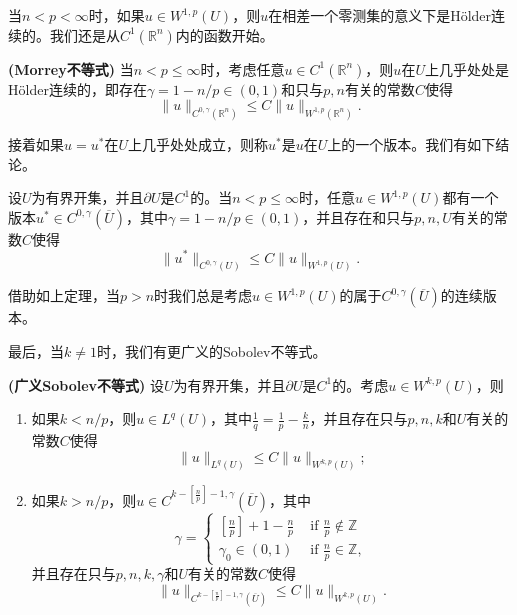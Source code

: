 \documentclass[a4paper,10pt]{ctexart}
\begin{document}
当$ n<p<\infty $时，如果$ u\in W^{1,p}(U) $，则$ u $在相差一个零测集的意义下是Hölder连续的。我们还是从$ C^1(\mathbb{R}^n) $内的函数开始。
\begin{theorem}{\normalfont\textbf{(Morrey不等式)}}
    当$ n<p\leqslant \infty $时，考虑任意$ u\in C^1(\mathbb{R}^n) $，则$ u $在$ U $上几乎处处是Hölder连续的，即存在$ \gamma = 1 - n / p\in (0,1) $和只与$ p,n $有关的常数$ C $使得
    \begin{equation}
        \| u \|_{C^{0,\gamma}(\mathbb{R}^n)} \leqslant C \| u \|_{W^{1,p}(\mathbb{R}^n)}.
    \end{equation}
\end{theorem}
接着如果$ u = u^* $在$ U $上几乎处处成立，则称$ u^* $是$ u $在$ U $上的一个版本。我们有如下结论。
\begin{theorem}
    设$ U $为有界开集，并且$ \partial U $是$ C^1 $的。当$ n<p\leqslant \infty $时，任意$ u\in W^{1,p}(U) $都有一个版本$ u^*\in C^{0,\gamma}(\overline{U}) $，其中$ \gamma = 1 - n / p\in (0,1) $，并且存在和只与$ p,n,U $有关的常数$ C $使得
    \begin{equation}
        \| u^* \|_{C^{0,\gamma}(U)} \leqslant C \| u \|_{W^{1,p}(U)}.
    \end{equation}
\end{theorem}
\noindent 借助如上定理，当$ p>n $时我们总是考虑$ u\in W^{1,p}(U) $的属于$ C^{0,\gamma}(\overline{U}) $的连续版本。

最后，当$ k\ne 1 $时，我们有更广义的Sobolev不等式。
\begin{theorem}{\normalfont\textbf{(广义Sobolev不等式)}}
    设$ U $为有界开集，并且$ \partial U $是$ C^1 $的。考虑$ u\in W^{k,p}(U) $，则
    \begin{enumerate}
        \item 如果$ k< n / p $，则$ u\in L^q(U) $，其中$ \frac{1}{q} = \frac{1}{p} - \frac{k}{n} $，并且存在只与$ p,n,k $和$ U $有关的常数$ C $使得
        \begin{equation}
            \| u \|_{L^q(U)} \leqslant C \| u \|_{W^{k,p}(U)};
        \end{equation}
        \item 如果$ k>n / p $，则$ u\in C^{k-[\frac{n}{p}]-1,\gamma}(\overline{U}) $，其中
        \[
            \gamma = 
            \begin{cases}
                [\frac{n}{p}]+1 - \frac{n}{p} & \text{ if } \frac{n}{p}\notin \mathbb{Z} \\
                \gamma_0\in (0,1) & \text{ if } \frac{n}{p}\in \mathbb{Z},
            \end{cases}
        \]
        并且存在只与$ p,n,k,\gamma $和$ U $有关的常数$ C $使得
        \begin{equation}
            \| u \|_{C^{k-[\frac{n}{p}]-1,\gamma}(\overline{U})} \leqslant C \| u \|_{W^{k,p}(U)}.
        \end{equation}
    \end{enumerate}
\end{theorem}
\end{document}
